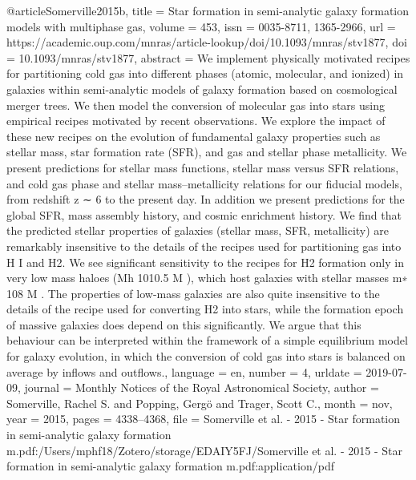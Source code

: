 {@article{Somerville2015b,
	title = {Star formation in semi-analytic galaxy formation models with multiphase gas},
	volume = {453},
	issn = {0035-8711, 1365-2966},
	url = {https://academic.oup.com/mnras/article-lookup/doi/10.1093/mnras/stv1877},
	doi = {10.1093/mnras/stv1877},
	abstract = {We implement physically motivated recipes for partitioning cold gas into different phases (atomic, molecular, and ionized) in galaxies within semi-analytic models of galaxy formation based on cosmological merger trees. We then model the conversion of molecular gas into stars using empirical recipes motivated by recent observations. We explore the impact of these new recipes on the evolution of fundamental galaxy properties such as stellar mass, star formation rate (SFR), and gas and stellar phase metallicity. We present predictions for stellar mass functions, stellar mass versus SFR relations, and cold gas phase and stellar mass–metallicity relations for our ﬁducial models, from redshift z ∼ 6 to the present day. In addition we present predictions for the global SFR, mass assembly history, and cosmic enrichment history. We ﬁnd that the predicted stellar properties of galaxies (stellar mass, SFR, metallicity) are remarkably insensitive to the details of the recipes used for partitioning gas into H I and H2. We see signiﬁcant sensitivity to the recipes for H2 formation only in very low mass haloes (Mh 1010.5 M ), which host galaxies with stellar masses m∗ 108 M . The properties of low-mass galaxies are also quite insensitive to the details of the recipe used for converting H2 into stars, while the formation epoch of massive galaxies does depend on this signiﬁcantly. We argue that this behaviour can be interpreted within the framework of a simple equilibrium model for galaxy evolution, in which the conversion of cold gas into stars is balanced on average by inﬂows and outﬂows.},
	language = {en},
	number = {4},
	urldate = {2019-07-09},
	journal = {Monthly Notices of the Royal Astronomical Society},
	author = {Somerville, Rachel S. and Popping, Gergö and Trager, Scott C.},
	month = nov,
	year = {2015},
	pages = {4338--4368},
	file = {Somerville et al. - 2015 - Star formation in semi-analytic galaxy formation m.pdf:/Users/mphf18/Zotero/storage/EDAIY5FJ/Somerville et al. - 2015 - Star formation in semi-analytic galaxy formation m.pdf:application/pdf}
}


}
